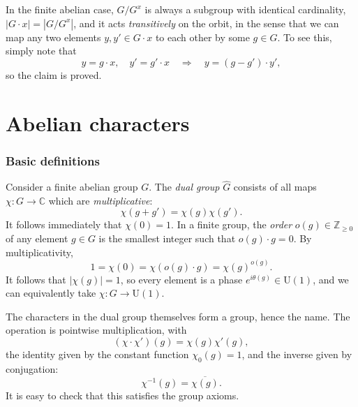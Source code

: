 \documentclass[aps, pre,reprint,nofootinbib,citeautoscript,floatfix]{revtex4-1}
\begin{document}
In the finite abelian case, $G/G^x$ is always a subgroup with
identical cardinality, $|G \cdot x| = |G/G^x|$, and it acts
\emph{transitively} on the orbit, in the sense that we can map any two
elements $y, y' \in G \cdot x$ to each other by some $g \in G$. To see
this, simply note that
\[
  y = g \cdot x, \quad y' = g' \cdot x \quad \Longrightarrow \quad y =
  (g - g') \cdot y',
\]
so the claim is proved.

\section{Abelian characters}
\label{sec:QFT}

\subsubsection*{Basic definitions}

Consider  a finite abelian group $G$.
The \emph{dual group} $\hat{G}$ consists of all maps $\chi: G
\to \mathbb{C}$ which are \emph{multiplicative}:
\begin{equation}
  \label{eq:74}
  \chi(g + g') = \chi(g)\chi(g').
\end{equation}
It follows immediately that $\chi(0) =1$.
In a finite group, the \emph{order} $o(g) \in \mathbb{Z}_{\geq 0}$ of any element $g \in G$ is the
smallest integer such that $o(g)\cdot g = 0$.
By multiplicativity,
\begin{equation}
  \label{eq:75}
  1 = \chi(0) = \chi(o(g) \cdot g) = \chi(g)^{o(g)}.
\end{equation}
It follows that $|\chi(g)| = 1$, so every element is a phase
$e^{i\theta(g)} \in \mathrm{U}(1)$, and we
can equivalently take $\chi: G \to \mathrm{U}(1)$.

The characters in the dual group themselves form a group, hence the
name.
The operation is pointwise multiplication, with
\begin{equation}
  \label{eq:76}
  (\chi \cdot \chi') (g) = \chi(g)\chi'(g),
\end{equation}
the identity given by the constant function $\chi_0(g) = 1$,
and the inverse given by conjugation:
\begin{equation}
  \label{eq:78}
  \chi^{-1}(g) = \overline{\chi(g)}.
\end{equation}
It is easy to check that this satisfies the group axioms.
\end{document}
